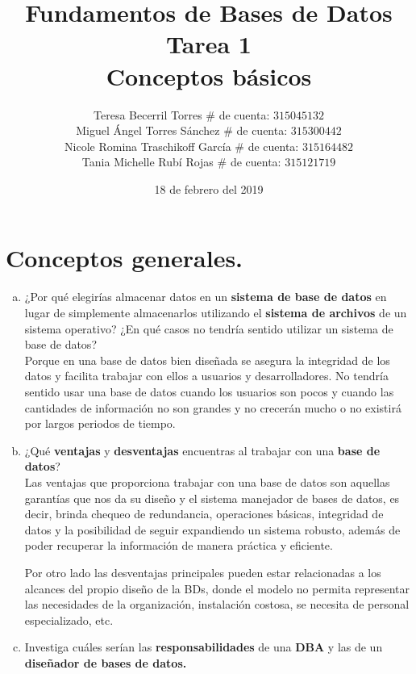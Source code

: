 \documentclass[letterpaper,12pt]{article}
\title{Fundamentos de Bases de Datos \\
        Tarea 1 \\
        Conceptos básicos}
\author{Teresa Becerril Torres
            $\#$ de cuenta: $315045132$ \\
            Miguel Ángel Torres Sánchez
            $\#$ de cuenta: $315300442$ \\
            Nicole Romina Traschikoff García
            $\#$ de cuenta: $315164482$ \\
            Tania Michelle Rubí Rojas
            $\#$ de cuenta: $315121719$}
\date{18 de febrero del 2019}
\begin{document}
    \maketitle

    \section{Conceptos generales.}
          \begin{enumerate}[a. ]

            \item ¿Por qué elegirías almacenar datos en un \textbf{sistema de base de datos} en lugar de simplemente almacenarlos utilizando el \textbf{sistema de archivos} de un sistema operativo? ¿En qué casos no tendría sentido utilizar un sistema de base de datos? \\

          Porque en una base de datos bien diseñada se asegura la integridad de los datos y facilita trabajar con ellos a usuarios y desarrolladores. No tendría sentido usar una base de datos cuando los usuarios son pocos y cuando las cantidades de información no son grandes y no crecerán mucho o no existirá por largos periodos de tiempo.

            \item ¿Qué \textbf{ventajas} y \textbf{desventajas} encuentras al trabajar con una \textbf{base de datos}?\\

            Las ventajas que proporciona trabajar con una base de datos son aquellas garantías que nos da su diseño y el sistema manejador de bases de datos, es decir, brinda chequeo de redundancia, operaciones básicas, integridad de datos y la posibilidad de seguir expandiendo un sistema robusto, además de poder recuperar la información de manera práctica y eficiente.

            Por otro lado las desventajas principales pueden estar relacionadas a los alcances del propio diseño de la BDs, donde el modelo no permita representar las necesidades de la organización, instalación costosa, se necesita de personal especializado, etc.


            \item Investiga cuáles serían las \textbf{responsabilidades} de una \textbf{DBA} y las de un \textbf{diseñador de bases de datos.}
            

\end{enumerate}
\end{document}
